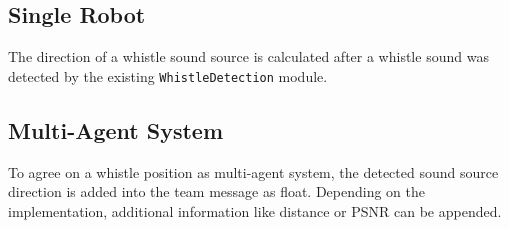 \subsection{Single Robot}
\label{subsec:03_singleRobot}

The direction of a whistle sound source is calculated after a whistle sound was detected
by the existing \lstinline!WhistleDetection! module.

\subsection{Multi-Agent System}
\label{subsec:03_multiAgend}

To agree on a whistle position as multi-agent system, the detected sound source
direction is added into the team message as float.
Depending on the implementation, additional information like distance or
\ac{PSNR} can be appended.

